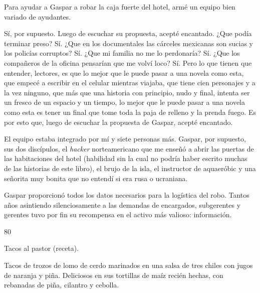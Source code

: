 \documentclass[12pt,twoside,openright,a5paper]{book}
\begin{document}
\nopagebreak

Para ayudar a Gaspar a robar la caja fuerte del hotel, armé un equipo bien
variado de ayudantes.

Sí, por supuesto. Luego de escuchar su propuesta, acepté encantado. ¿Que
podía terminar preso? Sí. ¿Que en los documentales las cárceles
mexicanas son sucias y los policías corruptos? Sí. ¿Que mi familia no
me lo perdonaría? Sí. ¿Que los compañeros de la oficina pensarían que
me volví loco? Sí. Pero lo que tienen que entender, lectores, es que lo
mejor que le puede pasar a una novela como esta, que empecé a escribir en el
celular mientras viajaba, que tiene cien personajes y a la vez ninguno, que
más que una historia con principio, nudo y final, intenta ser un fresco de
un espacio y un tiempo, lo mejor que le puede pasar a una novela como esta
es tener un final que tome toda la paja de relleno y la prenda fuego. Es
por esto que, luego de escuchar la propuesta de Gaspar, acepté encantado.

El equipo estaba integrado por mí y siete personas más. Gaspar, por supuesto,
sus dos discípulos, el \emph{hacker} norteamericano que me enseñó a abrir las
puertas de las habitaciones del hotel (habilidad sin la cual no podría
haber escrito muchas de las historias de este libro), el brujo de la isla,
el instructor de aquaeróbic y una señorita muy bonita que no entendí si
era rusa o ucraniana.

Gaspar proporcionó todos los datos necesarios para la logística del robo.
Tantos años asintiendo silenciosamente a las demandas de encargados,
subgerentes y gerentes tuvo por fin su recompensa en el activo más valioso:
información.


\vspace{0.5cm}

\hrulefill \hspace{0.1cm}\decofourleft\hspace{0.2cm} 80 \hspace{0.2cm}\decofourright \hspace{0.1cm}\hrulefill

\nopagebreak

\vspace{0.5cm}

\nopagebreak

Tacos al pastor (receta).

Tacos de trozos de lomo de cerdo marinados en una salsa de tres chiles
con jugos de naranja y piña. Deliciosos en sus tortillas de maíz recién
hechas, con rebanadas de piña, cilantro y cebolla.
\end{document}
